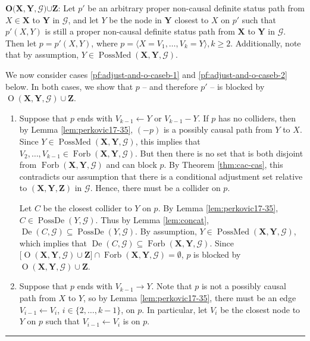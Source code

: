 \documentclass[twoside]{article}
\DeclareMathOperator{\De}{De}
\DeclareMathOperator{\PossDe}{PossDe}
\DeclareMathOperator{\Forb}{Forb}
\newcommand{\fb}[2][X,Y]{\Forb(\mb{#1},#2)}
\DeclareMathOperator{\PossMediators}{PossMed}
\newcommand{\possmediatb}[2][X,Y]{\PossMediators(\mb{#1},#2)}
\DeclareMathOperator{\Opt}{O}
\newcommand{\optb}[2][X,Y]{\Opt(\mb{#1},#2)}
\newcommand{\mb}[1]{\mathbf{#1}}
\newcommand{\g}[1][G]{\mathcal{#1}}
\newenvironment{proofof}[1][]{\begin{trivlist}
\item[\hskip \labelsep {\bfseries Proof of #1.}]}{\hfill\BlackBox\end{trivlist}}
\newcommand{\BlackBox}{\rule{1.5ex}{1.5ex}}
\begin{document}
\begin{proofof}[Theorem \ref{thm:adjust-and-o}]
            
        \begin{enumerate*}[label=(\alph*)]\setcounter{enumi}{1}
        \item\label{pf:adjust-and-o-caseb}
        $\textbf{O(}\mb{X,Y}, \pmb{\g} \textbf{)} \pmb{\cup} \mb{Z} \textbf{:}$ Let $p'$ be an arbitrary proper non-causal definite status path from $X \in \mb{X}$ to $\mb{Y}$ in $\g$, and let $Y$ be the node in $\mb{Y}$ closest to $X$ on $p'$ such that $p'(X,Y)$ is still a proper non-causal definite status path from $\mb{X}$ to $\mb{Y}$ in $\g$. Then let $p = p'(X,Y)$, where $p=\langle X=V_1, \dots, V_k = Y \rangle, k \ge 2$. Additionally, note that by assumption, $Y \in \possmediatb{\g}$.
        \end{enumerate*}
        
        We now consider cases \ref{pf:adjust-and-o-caseb-1} and \ref{pf:adjust-and-o-caseb-2} below. In both cases, we show that $p$ -- and therefore $p'$ -- is blocked by $\optb{\g} \cup \mb{Z}$.
        \begin{enumerate}[label = (\arabic*)]
        
            \item\label{pf:adjust-and-o-caseb-1} Suppose that $p$ ends with $V_{k-1} \gets Y$ or $V_{k-1}-Y$. If $p$ has no colliders, then by Lemma \ref{lem:perkovic17-35}, $(-p)$ is a possibly causal path from $Y$ to $X$. Since $Y \in \possmediatb{\g}$, this implies that $V_2, \dots, V_{k-1} \in \fb{\g}$. But then there is no set that is both disjoint from $\fb{\g}$ and can block $p$. By Theorem \ref{thm:cac-cas}, this contradicts our assumption that there is a conditional adjustment set relative to $(\mb{X,Y,Z})$ in $\g$. Hence, there must be a collider on $p$.
            
            Let $C$ be the closest collider to $Y$ on $p$. By Lemma \ref{lem:perkovic17-35}, $C \in \PossDe(Y, \g)$. Thus by Lemma \ref{lem:concat}, $\De(C, \g) \subseteq \PossDe(Y, \g)$. By assumption, $Y \in \possmediatb{\g}$, which implies that $\De(C, \g) \subseteq \fb{\g}$. Since $\big[ \optb{\g} \cup \mb{Z} \big] \cap \fb{\g} = \emptyset$, $p$ is blocked by $\optb{\g} \cup \mb{Z}$. 
           
            \item\label{pf:adjust-and-o-caseb-2} Suppose that $p$ ends with $V_{k-1} \to Y$. Note that $p$ is not a possibly causal path from $X$ to $Y$, so by Lemma \ref{lem:perkovic17-35}, there must be an edge $V_{i-1} \gets V_{i}$, $i \in \{2,\dots,k-1\}$, on $p$. In particular, let $V_i$ be the closest node to $Y$ on $p$ such that $V_{i-1} \gets V_{i}$ is on $p$. 
            

\end{enumerate}
\end{proofof}
\end{document}
